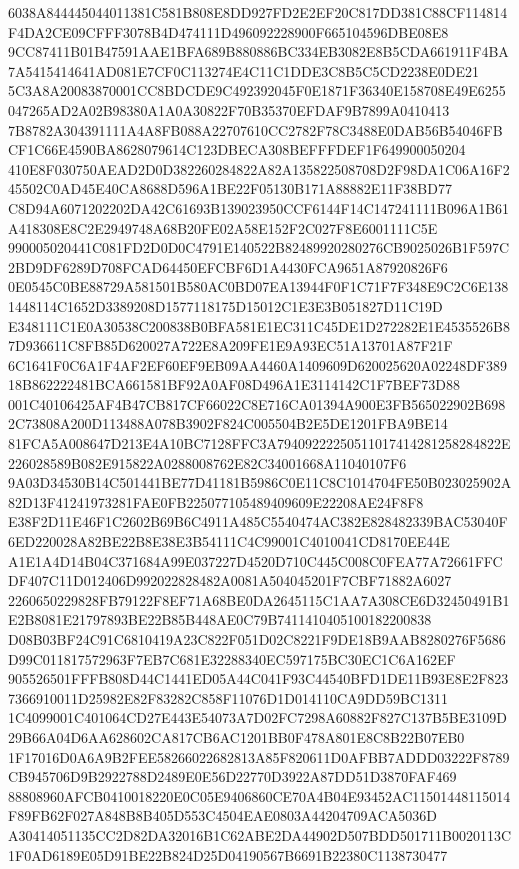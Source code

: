 \documentclass[UTF8,fontset=fandol,zihao=-4,a4paper]{ctexart}
\begin{document}
{{6038A844445044011381C581B808E8DD927FD2E2EF20C817DD381C88CF114814F4DA2CE09CFFF3078B4D474111D496092228900F665104596DBE08E8
9CC87411B01B47591AAE1BFA689B880886BC334EB3082E8B5CDA661911F4BA7A5415414641AD081E7CF0C113274E4C11C1DDE3C8B5C5CD2238E0DE21
5C3A8A20083870001CC8BDCDE9C492392045F0E1871F36340E158708E49E6255047265AD2A02B98380A1A0A30822F70B35370EFDAF9B7899A0410413
7B8782A304391111A4A8FB088A22707610CC2782F78C3488E0DAB56B54046FBCF1C66E4590BA8628079614C123DBECA308BEFFFDEF1F649900050204
410E8F030750AEAD2D0D382260284822A82A135822508708D2F98DA1C06A16F245502C0AD45E40CA8688D596A1BE22F05130B171A88882E11F38BD77
C8D94A6071202202DA42C61693B139023950CCF6144F14C147241111B096A1B61A418308E8C2E2949748A68B20FE02A58E152F2C027F8E6001111C5E
990005020441C081FD2D0D0C4791E140522B82489920280276CB9025026B1F597C2BD9DF6289D708FCAD64450EFCBF6D1A4430FCA9651A87920826F6
0E0545C0BE88729A581501B580AC0BD07EA13944F0F1C71F7F348E9C2C6E1381448114C1652D3389208D1577118175D15012C1E3E3B051827D11C19D
E348111C1E0A30538C200838B0BFA581E1EC311C45DE1D272282E1E4535526B87D936611C8FB85D620027A722E8A209FE1E9A93EC51A13701A87F21F
6C1641F0C6A1F4AF2EF60EF9EB09AA4460A1409609D620025620A02248DF38918B862222481BCA661581BF92A0AF08D496A1E3114142C1F7BEF73D88
001C40106425AF4B47CB817CF66022C8E716CA01394A900E3FB565022902B6982C73808A200D113488A078B3902F824C005504B2E5DE1201FBA9BE14
81FCA5A008647D213E4A10BC7128FFC3A79409222250511017414281258284822E226028589B082E915822A0288008762E82C34001668A11040107F6
9A03D34530B14C501441BE77D41181B5986C0E11C8C1014704FE50B023025902A82D13F41241973281FAE0FB225077105489409609E22208AE24F8F8
E38F2D11E46F1C2602B69B6C4911A485C5540474AC382E828482339BAC53040F6ED220028A82BE22B8E38E3B54111C4C99001C4010041CD8170EE44E
A1E1A4D14B04C371684A99E037227D4520D710C445C008C0FEA77A72661FFCDF407C11D012406D992022828482A0081A504045201F7CBF71882A6027
2260650229828FB79122F8EF71A68BE0DA2645115C1AA7A308CE6D32450491B1E2B8081E21797893BE22B85B448AE0C79B7411410405100182200838
D08B03BF24C91C6810419A23C822F051D02C8221F9DE18B9AAB8280276F5686D99C011817572963F7EB7C681E32288340EC597175BC30EC1C6A162EF
905526501FFFB808D44C1441ED05A44C041F93C44540BFD1DE11B93E8E2F8237366910011D25982E82F83282C858F11076D1D014110CA9DD59BC1311
1C4099001C401064CD27E443E54073A7D02FC7298A60882F827C137B5BE3109D29B66A04D6AA628602CA817CB6AC1201BB0F478A801E8C8B22B07EB0
1F17016D0A6A9B2FEE58266022682813A85F820611D0AFBB7ADDD03222F8789CB945706D9B2922788D2489E0E56D22770D3922A87DD51D3870FAF469
88808960AFCB0410018220E0C05E9406860CE70A4B04E93452AC11501448115014F89FB62F027A848B8B405D553C4504EAE0803A44204709ACA5036D
A30414051135CC2D82DA32016B1C62ABE2DA44902D507BDD501711B0020113C1F0AD6189E05D91BE22B824D25D04190567B6691B22380C1138730477
}}
\end{document}
